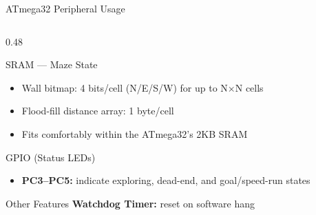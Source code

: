 \documentclass[aspectratio=169,11pt]{beamer}
\begin{document}
\begin{frame}{ATmega32 Peripheral Usage}
\begin{columns}[T]
\begin{column}{0.48\textwidth}
            \vspace{-0.15cm}
            \begin{block}{SRAM --- Maze State}
                \begin{itemize}\setlength{\itemsep}{-2pt}
                    \item Wall bitmap: 4 bits/cell (N/E/S/W) for up to N$\times$N cells
                    \item Flood-fill distance array: 1 byte/cell
                    \item Fits comfortably within the ATmega32's 2KB SRAM
                \end{itemize}
            \end{block}

            \vspace{-0.15cm}
            \begin{block}{GPIO (Status LEDs)}
                \begin{itemize}\setlength{\itemsep}{-2pt}
                    \item \textbf{PC3--PC5:} indicate exploring, dead-end, and goal/speed-run states
                \end{itemize}
            \end{block}

            \vspace{-0.15cm}
            \begin{block}{Other Features}
                \scriptsize
                \textbf{Watchdog Timer:} reset on software hang
            \end{block}
        \end{column}
    \end{columns}
\end{frame}

\end{document}
